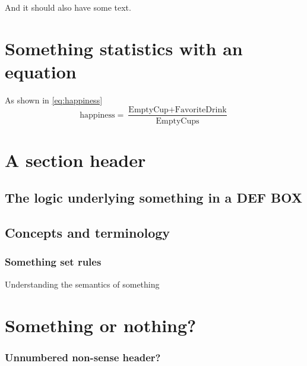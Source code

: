 And it should also have some text.


\section{Something statistics with an equation}
\label{sec:somestatistics}
	
As shown in \autoref{eq:happiness}
\begin{equation}\label{eq:happiness}
	\mbox{happiness}=\frac{\mbox{EmptyCup}+\mbox{FavoriteDrink}}{\mbox{EmptyCups}}
\end{equation}	
	
\section{A section header}
\label{sec:some-ref}
	
\subsection{The logic underlying something in a DEF BOX}
\label{subsec:logicunderlying}
    	
    	
\subsection{Concepts and terminology}
\label{subsec:conceptsterm}	
		
\subsubsection*{Something set rules} 

Understanding the semantics of something

\section{Something or nothing?}
\label{sec:someornot}

\subsubsection*{Unnumbered non-sense header?}

   	
    	
    
